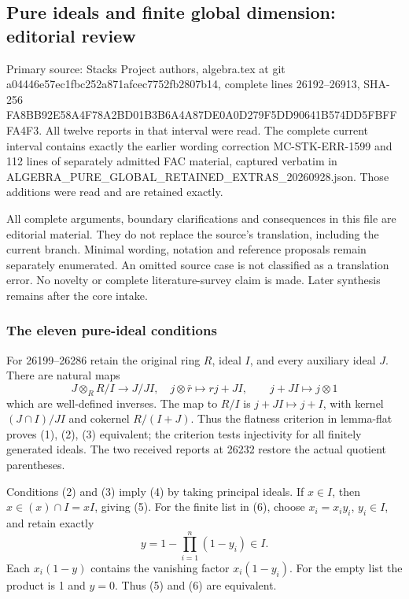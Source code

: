 \subsection{Pure ideals and finite global dimension: editorial review}\label{algebra-proof-022-pure-ideals-and-finite-global-dimension-editorial-review}

Primary source: Stacks Project authors, algebra.tex at git a04446e57ec1fbc252a871afcec7752fb2807b14, complete lines 26192--26913, SHA-256 FA8BB92E58A4F78A2BD01B3B6A4A87DE0A0D279F5DD90641B574DD5FBFFFA4F3. All twelve reports in that interval were read. The complete current interval contains exactly the earlier wording correction MC-STK-ERR-1599 and 112 lines of separately admitted FAC material, captured verbatim in ALGEBRA\_PURE\_GLOBAL\_RETAINED\_EXTRAS\_20260928.json. Those additions were read and are retained exactly.

All complete arguments, boundary clarifications and consequences in this file are editorial material. They do not replace the source's translation, including the current branch. Minimal wording, notation and reference proposals remain separately enumerated. An omitted source case is not classified as a translation error. No novelty or complete literature-survey claim is made. Later synthesis remains after the core intake.

\subsubsection{The eleven pure-ideal conditions}\label{algebra-proof-022-the-eleven-pure-ideal-conditions}

For 26199--26286 retain the original ring \(R\), ideal \(I\), and every auxiliary ideal \(J\). There are natural maps \[
J\otimes_RR/I\longrightarrow J/JI,\quad j\otimes\bar r\mapsto rj+JI,
\qquad j+JI\longmapsto j\otimes1
\] which are well-defined inverses. The map to \(R/I\) is \(j+JI\mapsto j+I\), with kernel \((J\cap I)/JI\) and cokernel \(R/(I+J)\). Thus the flatness criterion in lemma-flat proves (1), (2), (3) equivalent; the criterion tests injectivity for all finitely generated ideals. The two received reports at 26232 restore the actual quotient parentheses.

Conditions (2) and (3) imply (4) by taking principal ideals. If \(x\in I\), then \(x\in(x)\cap I=xI\), giving (5). For the finite list in (6), choose \(x_i=x_i y_i\), \(y_i\in I\), and retain exactly \[
y=1-\prod_{i=1}^n(1-y_i)\in I .
\] Each \(x_i(1-y)\) contains the vanishing factor \(x_i(1-y_i)\). For the empty list the product is 1 and \(y=0\). Thus (5) and (6) are equivalent.

